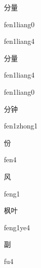 \begin{multicols*}{2}
\begin{verbete}{分量}
\begin{pronuncia}{fen1liang0}
\end{pronuncia}
\begin{pronuncia}{fen1liang4}
\end{pronuncia}
\end{verbete}

\begin{verbete}{分量}
\begin{pronuncia}{fen1liang4}
\end{pronuncia}
\begin{pronuncia}{fen1liang0}
\end{pronuncia}
\end{verbete}

\begin{verbete}{分钟}
\begin{pronuncia}{fen1zhong1}
\end{pronuncia}
\end{verbete}

\begin{verbete}[fen4]{份}
\begin{pronuncia}{fen4}
\end{pronuncia}
\end{verbete}

\begin{verbete}[feng1]{风}
\begin{pronuncia}{feng1}
\end{pronuncia}
\end{verbete}

\begin{verbete}[feng1ye4]{枫叶}
\begin{pronuncia}{feng1ye4}
\end{pronuncia}
\end{verbete}

\begin{verbete}[fu4]{副}
\begin{pronuncia}{fu4}
\end{pronuncia}
\end{verbete}


\end{multicols*}
